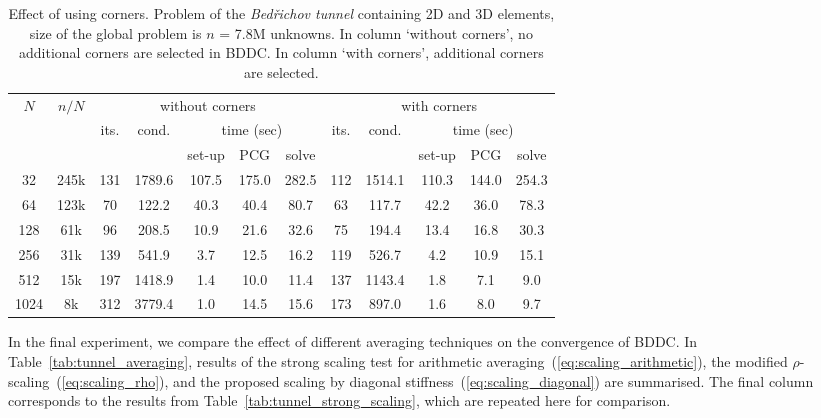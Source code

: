 \begin{table}[pth]
\begin{center}
\begin{tabular}
[c]{|cc|ccccc|ccccc|}\hline
\multirow{3}{*}{$N$} & \multirow{3}{*}{$n/N$} & \multicolumn{5}{c|}{without corners} & \multicolumn{5}{c|}{with corners}\\
                     &                        & \multirow{2}{*}{its.}  & \multirow{2}{*}{cond.} & \multicolumn{3}{c|}{time (sec)} & 
                                                \multirow{2}{*}{its.}  & \multirow{2}{*}{cond.} & \multicolumn{3}{c|}{time (sec)}\\
   &      &     &        & set-up & PCG & solve &  &  & set-up & PCG & solve\\\hline
32 & 245k & 131 & 1789.6 & 107.5 & 175.0 & 282.5 & 112 & 1514.1 & 110.3 & 144.0 & 254.3\\
64 & 123k & 70 & 122.2 & 40.3 & 40.4 & 80.7 & 63 & 117.7 & 42.2 & 36.0 & 78.3\\
128 & 61k & 96 & 208.5 & 10.9 & 21.6 & 32.6 & 75 & 194.4 & 13.4 & 16.8 & 30.3\\
256 & 31k & 139 & 541.9 & 3.7 & 12.5 & 16.2 & 119 & 526.7 & 4.2 & 10.9 & 15.1\\
512 & 15k & 197 & 1418.9 & 1.4 & 10.0 & 11.4 & 137 & 1143.4 & 1.8 & 7.1 & 9.0\\
1024 & 8k & 312 & 3779.4 & 1.0 & 14.5 & 15.6 & 173 & 897.0 & 1.6 & 8.0 & 9.7\\\hline
\end{tabular}
\end{center}
\caption{\label{tab:tunnel_corner_effect}
Effect of using corners. Problem of the \emph{Bed\v{r}ichov tunnel} 
containing 2D and 3D elements, size of the global problem is $n$ =
7.8M unknowns. In column `without corners', no additional corners are selected
in BDDC. In column `with corners', additional corners are selected.}
\end{table}

In the final experiment, we compare the effect of different averaging
techniques on the convergence of BDDC. In Table~\ref{tab:tunnel_averaging},
results of the strong scaling test for arithmetic averaging~(\ref{eq:scaling_arithmetic}), 
the modified $\rho$-scaling~(\ref{eq:scaling_rho}), 
and the proposed scaling by diagonal stiffness~(\ref{eq:scaling_diagonal}) are summarised. 
The final column corresponds to
the results from Table~\ref{tab:tunnel_strong_scaling}, which are repeated here for comparison.

